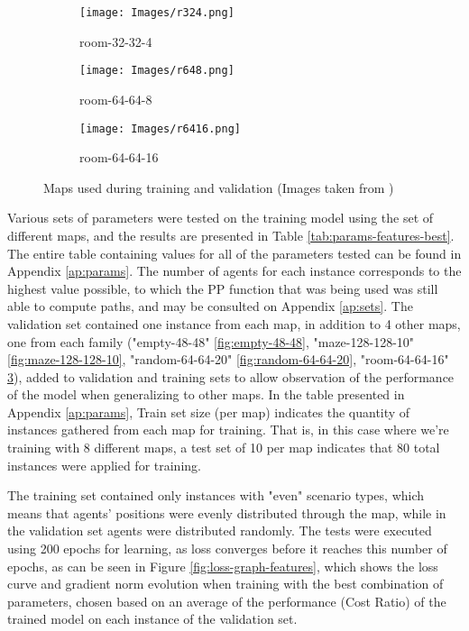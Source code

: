 \begin{figure}[htbp]
    \vspace{0.5cm}

    \begin{subfigure}[b]{0.3\textwidth}
        \texttt{[image: Images/r324.png]}
        \caption{room-32-32-4}
        \label{fig:room-32-32-4}
    \end{subfigure}
    \hspace{0.01\textwidth}
    \begin{subfigure}[b]{0.3\textwidth}
        \texttt{[image: Images/r648.png]}
        \caption{room-64-64-8}
        \label{fig:room-64-64-8}
    \end{subfigure}
    \hspace{0.01\textwidth}
    \begin{subfigure}[b]{0.3\textwidth}
        \texttt{[image: Images/r6416.png]}
        \caption{room-64-64-16}
        \label{fig:room-64-64-16}
    \end{subfigure}
    
    \caption{Maps used during training and validation (Images taken from \cite{shenTrackingProgressMultiAgent2023})}
    \label{fig:maps}
\end{figure}

Various sets of parameters were tested on the training model using the set of different maps, and the results are presented in Table \ref{tab:params-features-best}. The entire table containing values for all of the parameters tested can be found in Appendix \ref{ap:params}. The number of agents for each instance corresponds to the highest value possible, to which the PP function that was being used was still able to compute paths, and may be consulted on Appendix \ref{ap:sets}. The validation set contained one instance from each map, in addition to 4 other maps, one from each family ("empty-48-48" \ref{fig:empty-48-48}, "maze-128-128-10" \ref{fig:maze-128-128-10}, "random-64-64-20" \ref{fig:random-64-64-20}, "room-64-64-16" \ref{fig:room-64-64-16}), added to validation and training sets to allow observation of the performance of the model when generalizing to other maps. In the table presented in Appendix \ref{ap:params}, Train set size (per map) indicates the quantity of instances gathered from each map for training. That is, in this case where we're training with 8 different maps, a test set of 10 per map indicates that 80 total instances were applied for training.

The training set contained only instances with "even" scenario types, which means that agents' positions were evenly distributed through the map, while in the validation set agents were distributed randomly. The tests were executed using 200 epochs for learning, as loss converges before it reaches this number of epochs, as can be seen in Figure \ref{fig:loss-graph-features}, which shows the loss curve and gradient norm evolution when training with the best combination of parameters, chosen based on an average of the performance (Cost Ratio) of the trained model on each instance of the validation set.

